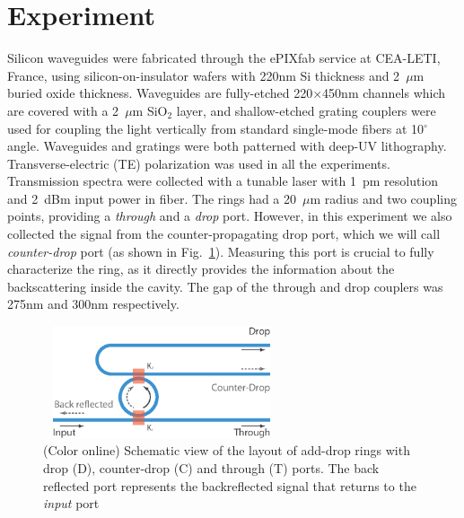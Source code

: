 \documentclass[10pt,letterpaper]{article}
\begin{document}
\section{Experiment}

Silicon waveguides were fabricated through the ePIXfab service at CEA-LETI, France, using silicon-on-insulator  wafers with 220nm Si thickness and 2~$\mu$m buried oxide thickness. Waveguides are fully-etched 220$\times$450nm channels which are covered with a 2~$\mu\textrm{m}$ SiO$_2$ layer, and shallow-etched grating couplers were used for coupling the light vertically from standard single-mode fibers at 10$^\circ$ angle. Waveguides and gratings were both patterned with deep-UV lithography. Transverse-electric (TE) polarization was used in all the experiments. Transmission spectra were collected with a tunable laser with 1~pm resolution and 2~dBm input power in fiber. The rings had a 20~$\mu$m radius and two coupling points, providing a \emph{through} and a  \emph{drop} port. However, in this experiment we also collected the signal from the counter-propagating drop port, which we will call \emph{counter-drop} port (as shown in Fig.~\ref{fig:add_drop_ring}). Measuring this port is crucial to fully characterize the ring, as it directly provides the information about the backscattering inside the cavity. The gap of the through and drop couplers was 275nm and 300nm respectively. 
\begin{figure}
    \centering
    \includegraphics[height=3.3cm,width=7.0cm]{add_drop_ring.eps}
    \caption{(Color online) Schematic view of the layout of add-drop rings with drop (D), counter-drop (C) and through (T) ports. The back reflected port represents the backreflected signal that returns to the \emph{input} port }
    \label{fig:add_drop_ring}
\end{figure}
\end{document}
